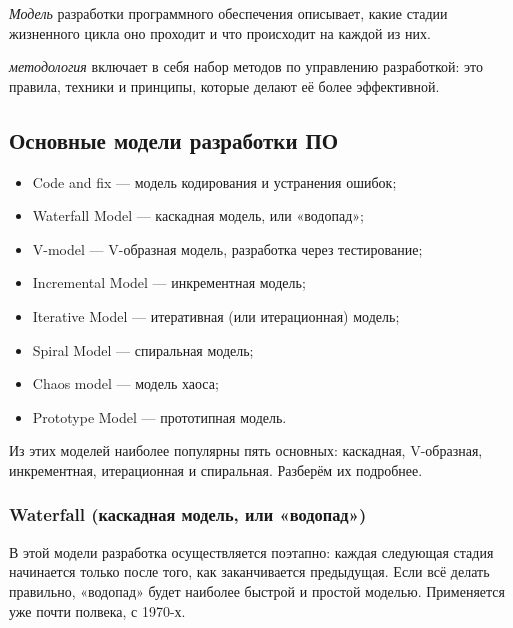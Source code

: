 \documentclass[a4paper]{article}
\begin{document}
\noindent\textit{Модель} разработки программного обеспечения описывает, какие стадии жизненного цикла оно проходит и что происходит на каждой из них.

 \textit{методология} включает в себя набор методов по управлению разработкой: это правила, техники и принципы, которые делают её более эффективной.

\subsection{Основные модели разработки ПО}

\begin{itemize}
    \item Code and fix — модель кодирования и устранения ошибок;
    \item Waterfall Model — каскадная модель, или «водопад»;
    \item V-model — V-образная модель, разработка через тестирование;
    \item Incremental Model — инкрементная модель;
    \item Iterative Model — итеративная (или итерационная) модель;
    \item Spiral Model — спиральная модель;
    \item Chaos model — модель хаоса;
    \item Prototype Model — прототипная модель.
\end{itemize}

Из этих моделей наиболее популярны пять основных: каскадная, V-образная, инкрементная, итерационная и спиральная. Разберём их подробнее.

\subsubsection{Waterfall (каскадная модель, или «водопад»)}

В этой модели разработка осуществляется поэтапно: каждая следующая стадия начинается только после того, как заканчивается предыдущая. Если всё делать правильно, «водопад» будет наиболее быстрой и простой моделью. Применяется уже почти полвека, с 1970-х.
\end{document}
